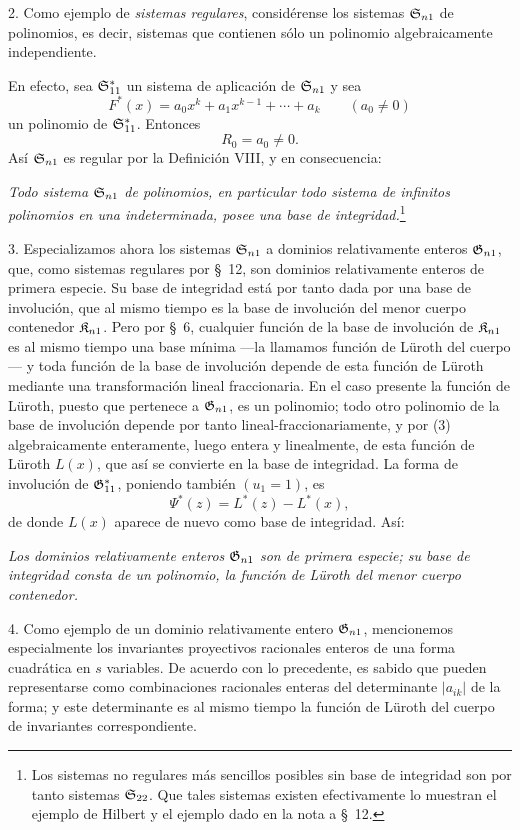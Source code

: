 \documentclass[11pt]{article}
\begin{document}
2. Como ejemplo de \emph{sistemas regulares}, considérense los sistemas $\mathfrak{S}_{n1}$ de polinomios, es decir, sistemas que contienen sólo un polinomio algebraicamente independiente.

En efecto, sea $\mathfrak{S}^*_{11}$ un sistema de aplicación de $\mathfrak{S}_{n1}$ y sea
\[
  F^*(x)=a_0x^k+a_1x^{k-1}+\cdots+a_k\qquad(a_0\ne0)
\]
un polinomio de $\mathfrak{S}^*_{11}$. Entonces
\begin{equation}
  R_0=a_0\ne0.
\tag{3}
\end{equation}
Así $\mathfrak{S}_{n1}$ es regular por la Definición VIII, y en consecuencia:

\emph{Todo sistema $\mathfrak{S}_{n1}$ de polinomios, en particular todo sistema de infinitos polinomios en una indeterminada, posee una base de integridad.}\footnote{Los sistemas no regulares más sencillos posibles sin base de integridad son por tanto sistemas $\mathfrak{S}_{22}$. Que tales sistemas existen efectivamente lo muestran el ejemplo de Hilbert y el ejemplo dado en la nota a \S\ 12.}

3. Especializamos ahora los sistemas $\mathfrak{S}_{n1}$ a dominios relativamente enteros $\mathfrak{G}_{n1}$, que, como sistemas regulares por \S\ 12, son dominios relativamente enteros de primera especie. Su base de integridad está por tanto dada por una base de involución, que al mismo tiempo es la base de involución del menor cuerpo contenedor $\mathfrak{K}_{n1}$. Pero por \S\ 6, cualquier función de la base de involución de $\mathfrak{K}_{n1}$ es al mismo tiempo una base mínima ---la llamamos función de Lüroth del cuerpo--- y toda función de la base de involución depende de esta función de Lüroth mediante una transformación lineal fraccionaria. En el caso presente la función de Lüroth, puesto que pertenece a $\mathfrak{G}_{n1}$, es un polinomio; todo otro polinomio de la base de involución depende por tanto lineal-fraccionariamente, y por (3) algebraicamente enteramente, luego entera y linealmente, de esta función de Lüroth $L(x)$, que así se convierte en la base de integridad. La forma de involución de $\mathfrak{G}^*_{11}$, poniendo también $(u_1=1)$, es
\[
  \Psi^*(z)=L^*(z)-L^*(x),
\]
de donde $L(x)$ aparece de nuevo como base de integridad. Así:

\emph{Los dominios relativamente enteros $\mathfrak{G}_{n1}$ son de primera especie; su base de integridad consta de un polinomio, la función de Lüroth del menor cuerpo contenedor.}

4. Como ejemplo de un dominio relativamente entero $\mathfrak{G}_{n1}$, mencionemos especialmente los invariantes proyectivos racionales enteros de una forma cuadrática en $s$ variables. De acuerdo con lo precedente, es sabido que pueden representarse como combinaciones racionales enteras del determinante $|a_{ik}|$ de la forma; y este determinante es al mismo tiempo la función de Lüroth del cuerpo de invariantes correspondiente.
\end{document}
